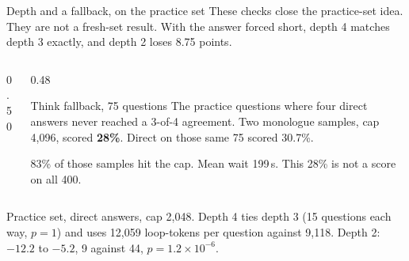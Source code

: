 \documentclass[aspectratio=169,11pt]{beamer}
\newcommand{\src}[1]{\par\vfill\begin{minipage}{0.96\textwidth}\color{muted}\tiny #1\end{minipage}\vspace{-0.2em}}
\begin{document}
\begin{frame}{Depth and a fallback, on the practice set}
  These checks close the practice-set idea. They are not a fresh-set result.
  With the answer forced short, depth 4 matches depth 3 exactly, and depth 2 loses 8.75 points.
  \vspace{0.05em}
  \begin{columns}[c]
    \begin{column}{0.50\textwidth}
    \end{column}
    \begin{column}{0.48\textwidth}
      \begin{block}{Think fallback, 75 questions}
        \small The practice questions where four direct answers never reached a 3-of-4 agreement.
        Two monologue samples, cap 4{,}096, scored \textbf{28\%}.
        Direct on those same 75 scored 30.7\%.
        \vspace{0.25em}

        {\scriptsize\color{muted} 83\% of those samples hit the cap. Mean wait 199\,s.
        This 28\% is not a score on all 400.}
      \end{block}
    \end{column}
  \end{columns}
  \src{Practice set, direct answers, cap 2{,}048.
  Depth 4 ties depth 3 (15 questions each way, $p = 1$) and uses 12{,}059 loop-tokens per question against 9{,}118.
  Depth 2: $-12.2$ to $-5.2$, 9 against 44, $p = 1.2\times 10^{-6}$.}
\end{frame}
\end{document}
